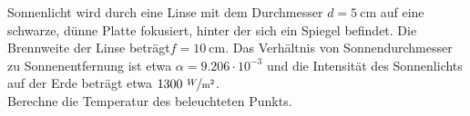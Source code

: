 \begin{Exercise}[label = cws, origin = Est.-Fin.-Auswahlklausur, title = Kochen mit der Sonne, difficulty = 4]
	Sonnenlicht wird durch eine Linse mit dem Durchmesser $d = 5~\mathrm{cm}$ auf eine schwarze, dünne Platte fokusiert, hinter der sich ein Spiegel befindet. Die Brennweite der Linse beträgt$f = 10~\mathrm{cm}$. Das Verhältnis von Sonnendurchmesser zu Sonnenentfernung ist etwa $\alpha=9.206\cdot10^{-3}$ und die Intensität des Sonnenlichts auf der Erde beträgt etwa $1300~\mathrm{\nicefrac{W}{m^2}}$.\\
	Berechne die Temperatur des beleuchteten Punkts.
 \end{Exercise}